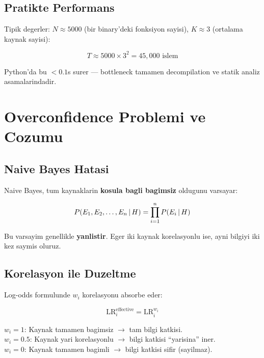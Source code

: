 \subsection{Pratikte Performans}

Tipik degerler: $N \approx 5000$ (bir binary'deki fonksiyon sayisi), $K \approx 3$ (ortalama kaynak sayisi):

\begin{equation}
T \approx 5000 \times 3^2 = 45{,}000 \text{ islem}
\end{equation}

Python'da bu $< 0.1$s surer --- bottleneck tamamen decompilation ve statik analiz asamalarindadir.


\section{Overconfidence Problemi ve Cozumu}
\label{sec:overconfidence}

\subsection{Naive Bayes Hatasi}

Naive Bayes, tum kaynaklarin \textbf{kosula bagli bagimsiz} oldugunu varsayar:

\begin{equation}
P\!\left(E_1, E_2, \ldots, E_n \,|\, H\right) = \prod_{i=1}^{n} P\!\left(E_i \,|\, H\right)
\end{equation}

Bu varsayim genellikle \textbf{yanlistir}. Eger iki kaynak korelasyonlu ise, ayni bilgiyi iki kez saymis oluruz.

\subsection{Korelasyon ile Duzeltme}

Log-odds formulunde $w_i$ korelasyonu absorbe eder:

\begin{equation}
\text{LR}_i^{\text{effective}} = \text{LR}_i^{w_i}
\end{equation}

$w_i = 1$: Kaynak tamamen bagimsiz $\to$ tam bilgi katkisi. \\
$w_i = 0.5$: Kaynak yari korelasyonlu $\to$ bilgi katkisi ``yarisina'' iner. \\
$w_i = 0$: Kaynak tamamen bagimli $\to$ bilgi katkisi sifir (sayilmaz).

